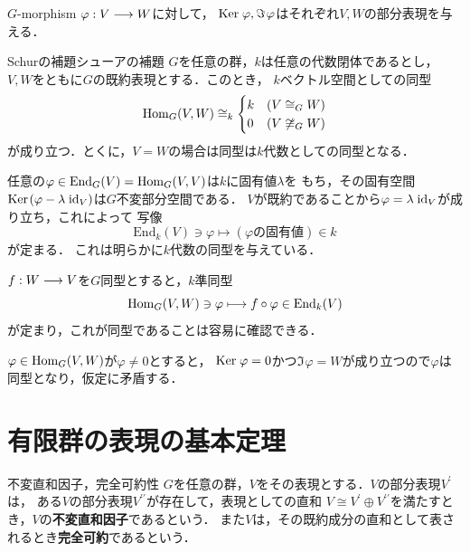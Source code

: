 \documentclass[a4paper,thmnumbering=section,eqnumbering=section]{summary-ja}
\newcommand{\edm}{\textrm{End}}
\newcommand{\hs}{\hspace{1pt}}
\begin{document}
\begin{remark}
    $G$-morphism $\varphi:V\longrightarrow W$に対して，
    $\Ker\hs\varphi, \Im\hs\varphi$はそれぞれ$V,W$の部分表現を与える．
\end{remark}

\begin{theorem}{Schurの補題}{シューアの補題}
    \quad $G$を任意の群，$k$は任意の代数閉体であるとし，$V,W$をともに$G$の既約表現とする．このとき，
    $k$ベクトル空間としての同型
    \begin{align}
        \operatorname{Hom}_G(V,W) \cong_k
            \begin{cases}
                k & (  V\cong_G W) \\
                0 & (  V\not\cong_G W)\\
            \end{cases}
    \end{align}
    が成り立つ．とくに，$V=W$の場合は同型は$k$代数としての同型となる．
\end{theorem}
\begin{myproof}\par
    [$V=W$のとき]\quad
    任意の$\varphi\in\edm_G(V)=\Hom_G(V,V)$は$k$に固有値$\lambda$を
    もち，その固有空間$\Ker\hs(\varphi - \lambda\hs\id_V)$は$G$不変部分空間である．
    $V$が既約であることから$\varphi=\lambda\hs\id_V$が成り立ち，これによって
    写像\[\edm_k(V)\ni\varphi\longmapsto(\varphi\textrm{の固有値})\in k\]が定まる．
    これは明らかに$k$代数の同型を与えている．\par
    [$V\cong_G W$のとき]\quad
    $f:W\longrightarrow V$を$G$同型とすると，$k$準同型
    \[\Hom_G(V,W) \ni \varphi \longmapsto f\circ\varphi\in \edm_k(V)\]
    が定まり，これが同型であることは容易に確認できる．\par 
    [$V\not\cong_G W$のとき]\quad
    $\varphi\in \operatorname{Hom}_G(V,W)$が$\varphi\neq 0$とすると，
    $\Ker\hs\varphi=0$かつ$\Im\hs\varphi = W$が成り立つので$\varphi$は同型となり，仮定に矛盾する．
\end{myproof}


\newpage\section{有限群の表現の基本定理}%

\begin{definition}{不変直和因子，完全可約性}{}
    $G$を任意の群，$V$をその表現とする．$V$の部分表現$V^\prime$は，
    ある$V$の部分表現$V^{\prime\prime}$が存在して，表現としての直和
    $V\cong V^\prime\oplus V^{\prime\prime}$を満たすとき，$V$の\textbf{不変直和因子}であるという．
    また$V$は，その既約成分の直和として表されるとき\textbf{完全可約}であるという．
\end{definition}
\end{document}
